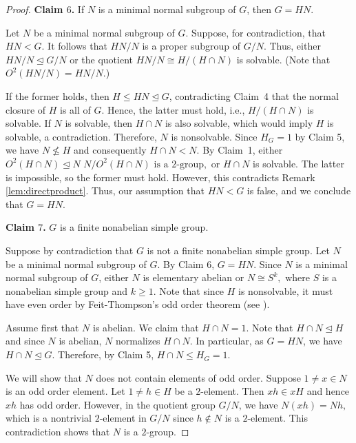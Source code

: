 \documentclass[twoside,a4paper,reqno,11pt]{amsart}
\newcommand{\<}{\langle}
\renewcommand{\>}{\rangle}
\newcommand{\leqs}{\leqslant}
\newcommand{\geqs}{\geqslant}
\renewcommand{\leq}{\leqs}
\renewcommand{\geq}{\geqs}
\renewcommand{\:}{\colon}
\theoremstyle{definition}
\begin{document}
\begin{proof}
\smallskip
\textbf{Claim $6$.}  
If $ N $ is a minimal normal subgroup of $ G $, then $G = HN.$
\smallskip

Let $ N$ be a minimal normal subgroup of $G$. Suppose, for contradiction, that $ HN < G $.
It follows that $ HN/N $ is a  proper subgroup of $ G/N $. Thus, either $HN/N \trianglelefteq G/N$ or the quotient $HN/N \cong H / (H \cap N)$ is solvable. (Note that $O^2(HN/N)=HN/N.$)

If the former holds, then $ H \leq HN \trianglelefteq G $, contradicting Claim~4 that the normal closure of $ H $ is all of $ G $. Hence, the latter must hold, i.e., $ H / (H \cap N) $ is solvable.
If $ N $ is solvable, then $ H \cap N $ is also solvable, which would imply $ H $ is solvable, a contradiction. Therefore, $ N $ is nonsolvable. Since $ H_G = 1 $ by Claim 5, we have $ N \not\leq H $ and consequently
$H \cap N < N.$  By Claim~1, either
$O^2(H \cap N) \trianglelefteq N$   $N / O^2(H \cap N) \text{ is a } 2\text{-group},$
or $ H \cap N $ is solvable.
The latter is impossible, so the former must hold. However, this contradicts Remark \ref{lem:directproduct}.
Thus, our assumption that $ HN < G $ is false, and we conclude that $ G = HN $.

\smallskip
\textbf{Claim $7$.} $G$ is a finite nonabelian simple group.
\smallskip

Suppose by contradiction that $G$ is not a finite nonabelian simple group. Let $N$ be a minimal normal subgroup of $G$. By Claim 6, $G = HN$. Since $N$ is a minimal normal subgroup of $G$, either $N$ is elementary abelian or 
$N \cong S^k,$
where $S$ is a nonabelian simple group and $k \geq 1$. Note that since $H$ is nonsolvable, it must have even order by Feit-Thompson's odd order theorem (see \cite{FT}). 

Assume first that $N$ is abelian. We claim that $H \cap N = 1$. Note that $H \cap N \trianglelefteq H$ and since $N$ is abelian, $N$ normalizes $H \cap N$. In particular, as $G = HN$, we have $H \cap N \trianglelefteq G$. Therefore, by Claim 5,  $H\cap N\leq H_G=1$. 


We will show that $N$ does not contain elements of odd order. Suppose $1 \neq x \in N$ is an odd order element. Let $1 \neq h \in H$ be a $2$-element. Then $xh \in xH$ and hence $xh$ has odd order. However, in the quotient group $G/N$, we have $N(xh) = Nh,$
which is a nontrivial $2$-element in $G/N$ since $h \notin N$ is a $2$-element. This contradiction shows that $N$ is a $2$-group.


\end{proof}
\end{document}
